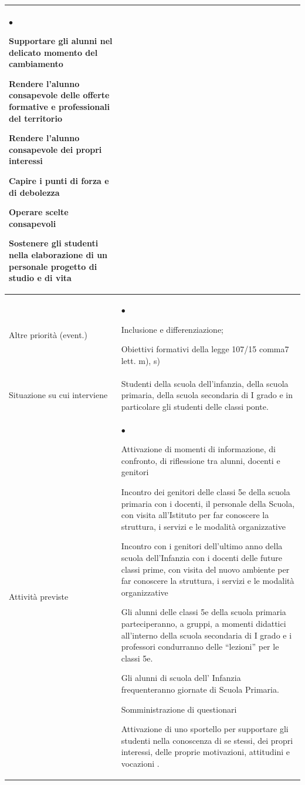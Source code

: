 \documentclass[12pt,a4paper,oneside]{memoir}
\newenvironment{elenco}{\begin{list}{$\bullet$}{%
              \setlength{\leftmargin}{4mm}%
              \setlength{\rightmargin}{1mm}%
               \setlength{\itemindent}{0mm}%
               \setlength{\labelwidth}{2mm}%
               \setlength{\labelsep}{2mm}%
              \setlength{\itemsep}{-\parsep}%
              \setlength{\partopsep}{0pt}%
              \setlength{\topsep}{0pt}%
             \setlength{\parskip}{0pt}%
              }}{\end{list}}
\begin{document}
\begin{footnotesize}
\begin{longtable}{|>{\raggedright}p{2.5cm}|>{\raggedright\arraybackslash}P{10cm}|}
\begin{elenco}
\item Supportare  gli alunni nel delicato momento del cambiamento
\item Rendere l'alunno consapevole delle offerte formative e professionali del territorio 
\item Rendere l'alunno consapevole dei propri interessi 
\item Capire i punti di forza e di debolezza 
\item Operare scelte consapevoli 
\item Sostenere gli studenti nella elaborazione di un personale progetto di studio e di vita 
\end{elenco}\\[-4mm] \hline
Altre priorità (event.)&
\begin{elenco}
\item Inclusione e differenziazione;
\item Obiettivi formativi della legge 107/15 comma7 lett. m), s)
\end{elenco}\\[-4mm] \hline
Situazione su cui interviene&Studenti della scuola dell'infanzia, della scuola primaria, della scuola secondaria di I grado e in particolare gli studenti delle classi ponte.\\ \hline
Attività previste&
\begin{elenco}
\item Attivazione di momenti di informazione, di confronto, di  riflessione tra alunni, docenti e genitori
\item Incontro dei genitori delle classi 5e della scuola primaria con i docenti, il personale della Scuola, con visita all'Istituto per far conoscere la struttura, i servizi e le modalità organizzative 
\item Incontro con i genitori dell'ultimo anno della scuola dell'Infanzia con i docenti delle future classi prime, con visita del nuovo ambiente per far conoscere la struttura, i servizi e le modalità organizzative 
\item  Gli alunni delle classi 5e della scuola primaria parteciperanno, a gruppi,  a momenti didattici all'interno della scuola secondaria di I grado e i professori condurranno delle “lezioni” per le classi 5e. 
\item Gli alunni di scuola dell' Infanzia frequenteranno giornate di Scuola Primaria.  
\item Somministrazione di questionari
\item Attivazione di uno sportello per supportare gli studenti nella conoscenza di se stessi, dei propri interessi, delle proprie motivazioni, attitudini e vocazioni .

\end{elenco}
\end{longtable}
\end{footnotesize}
\end{document}

